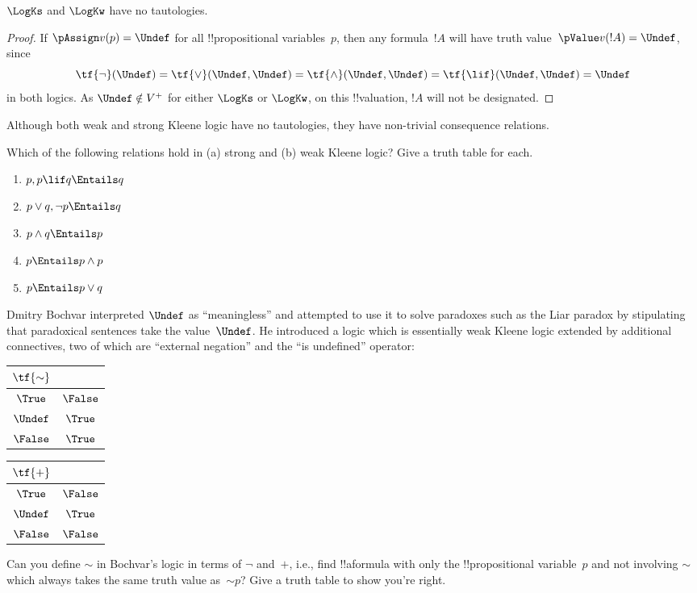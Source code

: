 \documentclass[../../../include/open-logic-section]{subfiles}
\begin{document}
\begin{prop}
  $\LogKs$ and $\LogKw$ have no tautologies.
\end{prop}

\begin{proof}
  If $\pAssign v(p) = \Undef$ for all !!{propositional variable}s~$p$,
  then any formula~$!A$ will have truth value~$\pValue v(!A) =
  \Undef$, since
  \[
    \tf{\lnot}(\Undef) = \tf{\lor}(\Undef, \Undef) = \tf{\land}(\Undef,
  \Undef) = \tf{\lif}(\Undef, \Undef) = \Undef
  \]
  in both logics. As $\Undef \notin V^+$ for either $\LogKs$ or
  $\LogKw$, on this !!{valuation}, $!A$ will not be designated.
\end{proof}

Although both weak and strong Kleene logic have no tautologies, they
have non-trivial consequence relations. 

\begin{prob}
  Which of the following relations hold in (a) strong and
  (b) weak Kleene logic? Give a truth table for each.
  \begin{enumerate}
    \item $p, p \lif q \Entails q$
    \item $p \lor q, \lnot p \Entails q$
    \item $p \land q \Entails p$
    \item $p \Entails p \land p$
    \item $p \Entails p \lor q$
  \end{enumerate}
\end{prob}

Dmitry Bochvar interpreted $\Undef$ as ``meaningless'' and attempted
to use it to solve paradoxes such as the Liar paradox by stipulating
that paradoxical sentences take the value~$\Undef$. He introduced a
logic which is essentially weak Kleene logic extended by additional
connectives, two of which are ``external negation'' and the ``is
undefined'' operator:
\begin{center}
  \begin{tabular}{c|c} 
    $\tf{\sim}$ & \\ 
    \hline  
    $\True$ & $\False$ \\ 
    $\Undef$ & $\True$ \\
    $\False$ & $\True$ 
  \end{tabular}
\quad
  \begin{tabular}{c|c} 
    $\tf{+}$ & \\ 
    \hline  
    $\True$ & $\False$ \\ 
    $\Undef$ & $\True$ \\
    $\False$ & $\False$ 
  \end{tabular}
\end{center}

\begin{prob}
  Can you define $\sim$ in Bochvar's logic in terms of $\lnot$
  and~$+$, i.e., find !!a{formula} with only the !!{propositional
  variable}~$p$ and not involving $\sim$ which always takes the same
  truth value as~$\mathord{\sim}p$?  Give a truth table to show you're
  right.
\end{prob}
\end{document}

